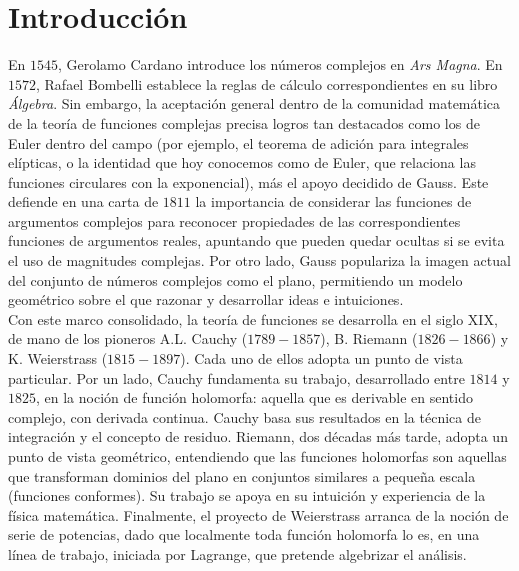 %
%

\chapter{Introducción}
\label{cap:introduccion}

En $1545$, Gerolamo Cardano introduce los números complejos en \textit{Ars Magna}. En $1572$, Rafael Bombelli establece la reglas de cálculo correspondientes en su libro \textit{Álgebra}. Sin embargo, la aceptación general dentro de la comunidad matemática de la teoría de funciones complejas precisa logros tan destacados como los de Euler dentro del campo (por ejemplo, el teorema de adición para integrales elípticas, o la identidad que hoy conocemos como de Euler, que relaciona las funciones circulares con la exponencial), más el apoyo decidido de Gauss. Este defiende en una carta de $1811$ la importancia de considerar las funciones de argumentos complejos para reconocer propiedades de las correspondientes funciones de argumentos reales, apuntando que pueden quedar ocultas si se evita el uso de magnitudes complejas. Por otro lado, Gauss populariza la imagen actual del conjunto de números complejos como el plano, permitiendo un modelo geométrico sobre el que razonar y desarrollar ideas e intuiciones. \\

Con este marco consolidado, la teoría de funciones se desarrolla en el siglo XIX, de mano de los pioneros A.L. Cauchy ($1789-1857$), B. Riemann ($1826-1866$) y K. Weierstrass ($1815-1897$). Cada uno de ellos adopta un punto de vista particular. Por un lado, Cauchy fundamenta su trabajo, desarrollado entre $1814$ y $1825$, en la noción de función holomorfa: aquella que es derivable en sentido complejo, con derivada continua. Cauchy basa sus resultados en la técnica de integración y el concepto de residuo. Riemann, dos décadas más tarde, adopta un punto de vista geométrico, entendiendo que las funciones holomorfas son aquellas que transforman dominios del plano en conjuntos similares a pequeña escala (funciones conformes). Su trabajo se apoya en su intuición y experiencia de la física matemática. Finalmente, el proyecto de Weierstrass arranca de la noción de serie de potencias, dado que localmente toda función holomorfa lo es, en una línea de trabajo, iniciada por Lagrange, que pretende algebrizar el análisis. \\

